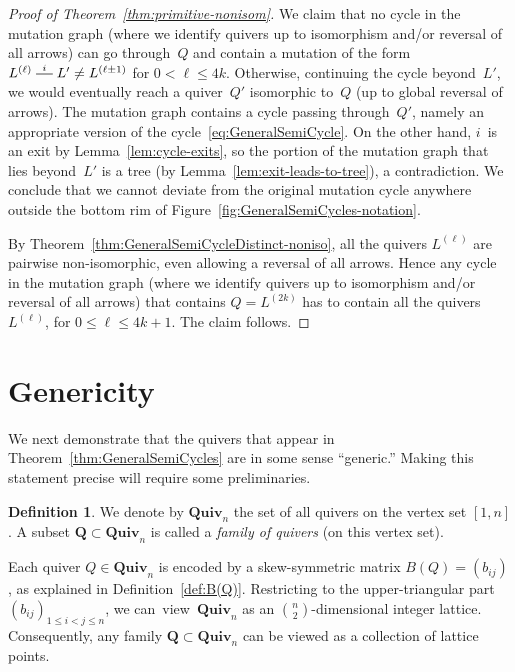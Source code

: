 \documentclass[11pt, letterpaper]{amsart}
\theoremstyle{definition}
\newtheorem{definition}[theorem]{Definition}
\numberwithin{equation}{section}
\def\Quiv {{\mathbf{Quiv}}}
\newcommand{\shortmutation}[1]{\stackrel{#1}{\rule[.5ex]{1.2em}{0.5pt}}}
\begin{document}
\begin{proof}[Proof of Theorem~\ref{thm:primitive-nonisom}]
We claim that no cycle in the mutation graph (where we identify quivers up to isomorphism and/or reversal of all arrows) 
can go through~$Q$ and contain a mutation of the form 
$L^{(\ell)}\shortmutation{i} L'\neq L^{(\ell\pm1)}$ for $0<\ell\le 4k$. 
Otherwise, continuing the cycle beyond~$L'$, we would eventually reach a quiver~$Q'$ isomorphic to~$Q$
(up to global reversal of arrows).
The mutation graph contains a cycle passing through~$Q'$, 
namely an appropriate version of the cycle~\eqref{eq:GeneralSemiCycle}. 
On the other hand, $i$~is an exit by Lemma~\ref{lem:cycle-exits}, so the portion of the mutation graph
that lies beyond~$L'$ is a tree (by Lemma~\ref{lem:exit-leads-to-tree}), a contradiction.
We conclude that we cannot deviate from the original mutation cycle anywhere outside the bottom rim of Figure~\ref{fig:GeneralSemiCycles-notation}. 

By Theorem~\ref{thm:GeneralSemiCycleDistinct-noniso}, all the quivers $L^{(\ell)}$ are pairwise non-isomorphic, 
even allowing a reversal of all arrows. 
Hence any cycle in the mutation graph (where we identify quivers up to isomorphism and/or reversal of all arrows) 
that contains $Q=L^{(2k)}$ has to contain all the quivers $L^{(\ell)}$, for $0\le \ell\le 4k+1$. 
The claim follows.
\end{proof}

\newpage

\section{Genericity}
\label{sec:genericity}

We next demonstrate that the quivers
that appear in Theorem~\ref{thm:GeneralSemiCycles} are in some sense ``generic.''
Making this statement precise will require some preliminaries.

\begin{definition}
\label{def:quivers=lattice-points}
We denote by $\Quiv_n$ the set of all quivers on the vertex set $[1,n]$.
A subset $\mathbf{Q}\subset\Quiv_n$ is called a \emph{family of quivers} (on this vertex set). 

Each quiver $Q\in\Quiv_n$ is encoded by a skew-symmetric matrix ${B(Q)=(b_{ij})}$, as explained in Definition~\ref{def:B(Q)}. 
Restricting to the upper-triangular part $(b_{ij})_{1\le i<j\le n}$, 
we can~view~$\Quiv_n$ as an ${\binom{n}{2}}$-dimensional integer lattice. 
Consequently, any family $\mathbf{Q}\subset\Quiv_n$ can be viewed as a collection of lattice points. 
\end{definition}
\end{document}
